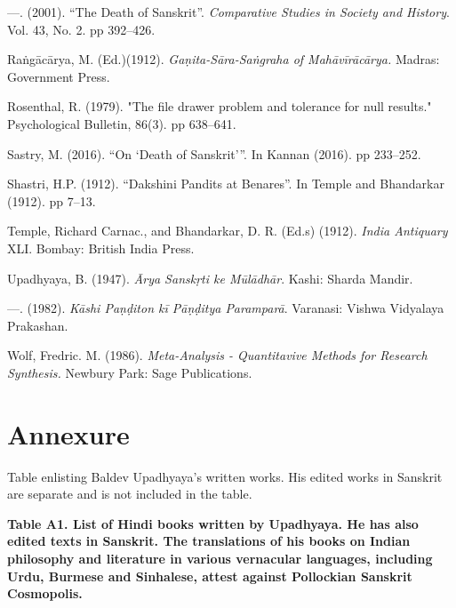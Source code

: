\begin{thebibliography}{99}
  —. (2001). “The Death of Sanskrit”. \textit{Comparative Studies in Society and History}. Vol. 43, No. 2. pp 392--426.

  Raṅgācārya, M. (Ed.)(1912). \textit{Gaṇita-Sāra-Saṅgraha of Mahāvīrācārya.} Madras: Government Press.

  Rosenthal, R. (1979). "The file drawer problem and tolerance for null results." Psychological Bulletin, 86(3). pp 638--641.

  Sastry, M. (2016). “On ‘Death of Sanskrit’”. In Kannan (2016). pp 233--252.

  Shastri, H.P. (1912). “Dakshini Pandits at Benares”. In Temple and Bhandarkar (1912). pp 7--13.

  Temple, Richard Carnac., and Bhandarkar, D. R. (Ed.s) (1912). \textit{India Antiquary} XLI. Bombay: British India Press.

  Upadhyaya, B. (1947). \textit{Ārya Sanskṛti ke Mūlādhār}. Kashi: Sharda Mandir.

  —. (1982). \textit{Kāshi Paṇḍiton kī Pāṇḍitya Paramparā}. Varanasi: Vishwa Vidyalaya Prakashan.

  Wolf, Fredric. M. (1986). \textit{Meta-Analysis - Quantitavive Methods for Research Synthesis.} Newbury Park: Sage Publications.

 \end{thebibliography}


\section*{Annexure}

Table enlisting Baldev Upadhyaya’s written works. His edited works in Sanskrit are separate and is not included in the table.

\textbf{Table A1. List of Hindi books written by Upadhyaya. He has also edited texts in Sanskrit. The translations of his books on Indian philosophy and literature in various vernacular languages, including Urdu, Burmese and Sinhalese, attest against Pollockian Sanskrit Cosmopolis.}

